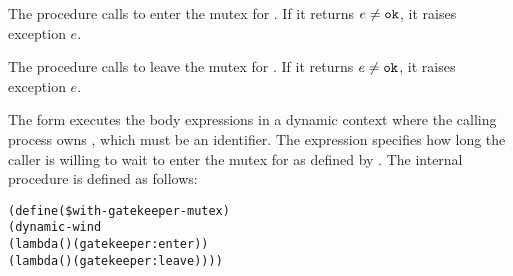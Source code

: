 The  procedure calls  to enter the
mutex for . If it returns $e \ne \code{ok}$, it raises
exception $e$.

\begin{procedure}
\end{procedure}
\returns{} 

The  procedure calls  to leave the mutex for
. If it returns $e \ne \code{ok}$, it raises exception
$e$.

\begin{syntax}
\end{syntax}
\expandsto{}

The  form executes the body expressions in a
dynamic context where the calling process owns , which
must be an identifier. The  expression specifies how long
the caller is willing to wait to enter the mutex for  as
defined by .  The internal
 procedure is defined as follows:\antipar
\begin{samepage}\begin{alltt}
(define (\$with-gatekeeper-mutex   )
  (dynamic-wind
    (lambda () (gatekeeper:enter  ))
    (lambda () (gatekeeper:leave ))))
\end{alltt}\end{samepage}

